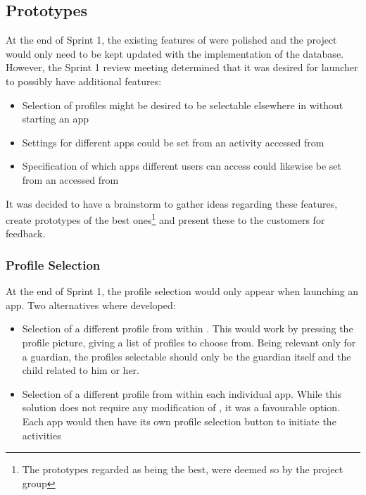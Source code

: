 \subsection{Prototypes}\label{sec:sprint2:prototypes}

At the end of Sprint 1, the existing features of \launcher were polished and the project would only need to be kept updated with the implementation of the database. 
However, the Sprint 1 review meeting determined that it was desired for launcher to possibly have additional features:

\begin{itemize}
\item Selection of profiles might be desired to be selectable elsewhere in \launcher without starting an app
\item Settings for different apps could be set from an activity accessed from \launcher
\item Specification of which apps different users can access could likewise be set from an accessed from \launcher
\end{itemize}

It was decided to have a brainstorm to gather ideas regarding these features, create prototypes of the best ones\footnote{The prototypes regarded as being the best, were deemed so by the project group} and present these to the customers for feedback.

\subsubsection{Profile Selection}

At the end of Sprint 1, the profile selection would only appear when launching an app.
Two alternatives where developed:

\begin{itemize}
\item Selection of a different profile from within \launcher.
This would work by pressing the profile picture, giving a list of profiles to choose from.
Being relevant only for a guardian, the profiles selectable should only be the guardian itself and the child related to him or her.
\item Selection of a different profile from within each individual app.
While this solution does not require any modification of \launcher, it was a favourable option.
Each app would then have its own profile selection button to initiate the activities
\end{itemize}

